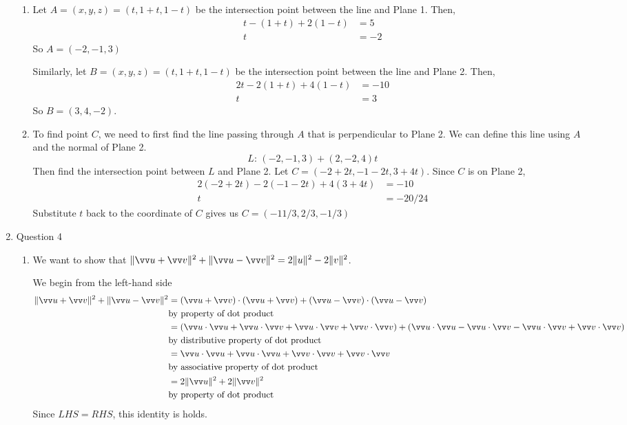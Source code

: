 \documentclass[11pt]{article}
\newcommand{\norm}[1]{\lVert #1 \rVert}
\begin{document}
\begin{enumerate}
\begin{enumerate}
        \item Let $A = (x,y,z) = (t,1+t,1-t)$ be the intersection point between the line and Plane 1. Then,
        \begin{align*}
            t-(1+t)+2(1-t) &= 5 \\
            t &= -2
        \end{align*}
        So $A=(-2,-1,3)$
        
        Similarly, let $B = (x,y,z) = (t,1+t,1-t)$ be the intersection point between the line and Plane 2. Then,
        \begin{align*}
            2t - 2(1+t) + 4(1-t) &= -10 \\
            t &= 3
        \end{align*}
        So $B=(3,4,-2)$.
        
        \item To find point $C$, we need to first find the line passing through $A$ that is perpendicular to Plane 2. We can define this line using $A$ and the normal of Plane 2.
        $$
        L:\, (-2,-1,3)+(2,-2,4)t
        $$
        Then find the intersection point between $L$ and Plane 2. Let $C=(-2+2t,-1-2t,3+4t)$. Since $C$ is on Plane 2,
        \begin{align*}
            2(-2+2t) - 2(-1-2t) + 4(3+4t) &= -10 \\
            t&=-20/24
        \end{align*}
        Substitute $t$ back to the coordinate of $C$ gives us $C=(-11/3,2/3,-1/3)$
    \end{enumerate}
    
    \item Question 4
    \begin{enumerate}
        \item 
        We want to show that $\norm{\vv u + \vv v}^2 + \norm{\vv u - \vv v}^2 = 2\norm{u}^2 - 2\norm{v}^2$.
    
        We begin from the left-hand side
        \begin{align*}
            \norm{\vv u + \vv v}^2 + \norm{\vv u - \vv v}^2 &= (\vv u + \vv v) \cdot (\vv u + \vv v) + (\vv u - \vv v) \cdot (\vv u - \vv v) \\
            & \text{by property of dot product} \\
            &= (\vv u \cdot \vv u + \vv u \cdot \vv v + \vv u \cdot \vv v + \vv v \cdot \vv v) + (\vv u \cdot \vv u - \vv u \cdot \vv v - \vv u \cdot \vv v + \vv v \cdot \vv v) \\
            & \text{by distributive property of dot product} \\
            &= \vv u \cdot \vv u + \vv u \cdot \vv u + \vv v \cdot \vv v + \vv v \cdot \vv v \\
            & \text{by associative property of dot product} \\
            &= 2\norm{\vv u}^2 + 2\norm{\vv v}^2 \\
            & \text{by property of dot product}
        \end{align*}
        Since $LHS=RHS$, this identity is holds.
        

\end{enumerate}
\end{enumerate}
\end{document}
